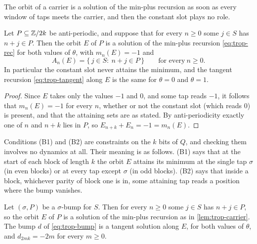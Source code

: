 The orbit of a carrier is a solution of the min-plus recursion as soon as every
window of taps meets the carrier, and then the constant slot plays no role.

\begin{lemma}
\label{lem:trop-carrier}
Let $P\subseteq\mathbb{Z}/2k$ be anti-periodic, and suppose that for every $n\ge0$ some
$j\in S$ has $n+j\in P$. Then the orbit $E$ of $P$ is a solution of the min-plus
recursion \eqref{eq:trop-rec} for both values of $\theta$, with $m_n(E)=-1$ and
\[
A_n(E)=\{\,j\in S:\ n+j\in P\,\}\qquad\text{for every}\ n\ge0.
\]
In particular the constant slot never attains the minimum, and the tangent
recursion \eqref{eq:trop-tangent} along $E$ is the same for $\theta=0$ and
$\theta=1$.
\end{lemma}

\begin{proof}
Since $E$ takes only the values $-1$ and $0$, and some tap reads $-1$, it follows
that $m_n(E)=-1$ for every $n$, whether or not the constant slot (which reads $0$)
is present, and that the attaining sets are as stated. By anti-periodicity exactly
one of $n$ and $n+k$ lies in $P$, so $E_{n+k}+E_n=-1=m_n(E)$.
\end{proof}

Conditions (B1) and (B2) are constraints on the $k$ bits of $Q$, and checking them
involves no dynamics at all. Their meaning is as follows. (B1) says that at the
start of each block of length $k$ the orbit $E$ attains its minimum at the
single tap $\sigma$ (in even blocks) or at every tap except $\sigma$ (in odd
blocks). (B2) says that inside a block, whichever parity of block one is in, some
attaining tap reads a position where the bump vanishes.

\begin{lemma}
\label{lem:trop-bumptangent}
Let $(\sigma,P)$ be a $\sigma$-bump for $S$. Then for every $n\ge0$ some $j\in S$
has $n+j\in P$, so the orbit $E$ of $P$ is a solution of the min-plus recursion as
in \autoref{lem:trop-carrier}. The bump $d$ of \eqref{eq:trop-bump} is a tangent
solution along $E$, for both values of $\theta$, and $d_{2mk}=-2m$ for every
$m\ge0$.
\end{lemma}


